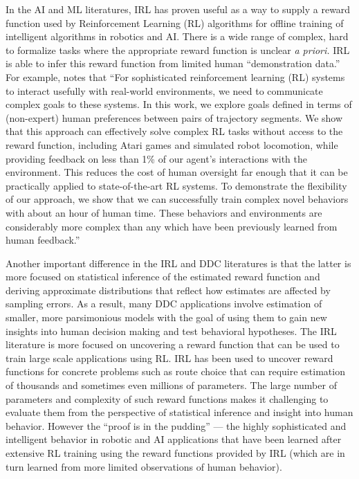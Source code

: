 In the AI and ML literatures, IRL has proven useful as a way to supply 
a reward function used by Reinforcement Learning (RL) algorithms for offline training of intelligent algorithms in robotics and AI. 
There is a wide range of complex, hard to formalize tasks where the appropriate reward function
is unclear {\it a priori.\/} IRL is able to infer this reward function from limited human ``demonstration data.'' 
For example, \citet{christiano:2017} notes that
``For sophisticated reinforcement learning (RL) systems to interact usefully with real-world environments, we need to communicate complex goals to these systems. In this work, we explore goals defined in terms of (non-expert) human preferences between pairs of trajectory segments. 
We show that this approach can effectively solve complex RL tasks without access to the reward function, including Atari games and simulated robot locomotion, while providing feedback on less than 1\% of our agent's interactions with the environment. 
This reduces the cost of human oversight far enough that it can be practically applied to state-of-the-art RL systems. 
To demonstrate the flexibility of our approach, we show that we can successfully train complex novel behaviors with about an hour of human time. These behaviors and environments are considerably more complex than any which have been previously learned from human feedback.''

Another important difference in the IRL and DDC literatures
is that the latter is more focused on statistical inference of the 
estimated reward function and deriving approximate distributions that reflect how
estimates are affected by sampling errors. As a result, many  DDC applications involve estimation of 
smaller, more parsimonious models with the goal of using them to gain new insights
into human decision making and test behavioral hypotheses.  The IRL literature is more focused on 
uncovering a reward function that can be used to train large scale applications using RL.  
IRL has been used to uncover reward functions for concrete problems such as route choice
that can require estimation of thousands and sometimes even millions of parameters. 
The large number of parameters and complexity of such reward
functions makes it challenging to evaluate them from the perspective of statistical inference and insight
into human  behavior. However the  ``proof is in the pudding'' --- 
the highly sophisticated and intelligent behavior in robotic and AI applications that have been learned
after extensive RL training using the reward functions provided by IRL (which are in turn learned from more limited observations of human behavior).

